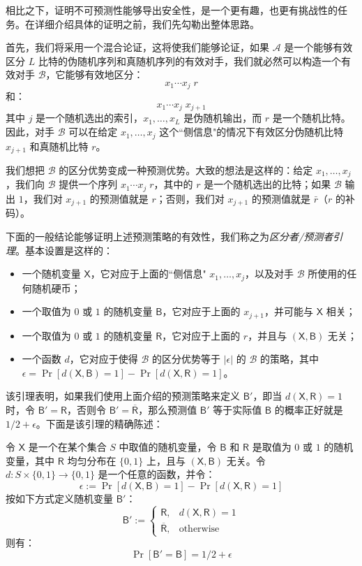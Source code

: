 相比之下，证明不可预测性能够导出安全性，是一个更有趣，也更有挑战性的任务。在详细介绍具体的证明之前，我们先勾勒出整体思路。

首先，我们将采用一个混合论证，这将使我们能够论证，如果 $\mathcal{A}$ 是一个能够有效区分 $L$ 比特的伪随机序列和真随机序列的有效对手，我们就必然可以构造一个有效对手 $\mathcal{B}$，它能够有效地区分：
\[
x_1\cdots x_j\;r
\]
和：
\[
x_1\cdots x_j\;x_{j+1}
\]
其中 $j$ 是一个随机选出的索引，$x_1,\dots,x_L$ 是伪随机输出，而 $r$ 是一个随机比特。因此，对手 $\mathcal{B}$ 可以在给定 $x_1,\dots,x_j$ 这个``侧信息"的情况下有效区分伪随机比特 $x_{j+1}$ 和真随机比特 $r$。

我们想把 $\mathcal{B}$ 的区分优势变成一种预测优势。大致的想法是这样的：给定 $x_1,\dots,x_j$，我们向 $\mathcal{B}$ 提供一个序列 $x_1\cdots x_j\;r$，其中的 $r$ 是一个随机选出的比特；如果 $\mathcal{B}$ 输出 $1$，我们对 $x_{j+1}$ 的预测值就是 $r$；否则，我们对 $x_{j+1}$ 的预测值就是 $\bar{r}$（$r$ 的补码）。

下面的一般结论能够证明上述预测策略的有效性，我们称之为\emph{区分者/预测者引理}。基本设置是这样的：
\begin{itemize}
	\item 一个随机变量 $\mathsf{X}$，它对应于上面的``侧信息" $x_1,\dots,x_j$，以及对手 $\mathcal{B}$ 所使用的任何随机硬币；
	\item 一个取值为 $0$ 或 $1$ 的随机变量 $\mathsf{B}$，它对应于上面的 $x_{j+1}$，并可能与 $\mathsf{X}$ 相关；
	\item 一个取值为 $0$ 或 $1$ 的随机变量 $\mathsf{R}$，它对应于上面的 $r$，并且与 $(\mathsf{X},\mathsf{B})$ 无关；
	\item 一个函数 $d$，它对应于使得 $\mathcal{B}$ 的区分优势等于 $|\epsilon|$ 的 $\mathcal{B}$ 的策略，其中 $\epsilon=\Pr[d(\mathsf{X},\mathsf{B})=1]-\Pr[d(\mathsf{X},\mathsf{R})=1]$。
\end{itemize}
该引理表明，如果我们使用上面介绍的预测策略来定义 $\mathsf{B}'$，即当 $d(\mathsf{X},\mathsf{R})=1$ 时，令 $\mathsf{B}'=\mathsf{R}$，否则令 $\mathsf{B}'=\mathsf{\overline R}$，那么预测值 $\mathsf{B}'$ 等于实际值 $\mathsf{B}$ 的概率正好就是 $1/2+\epsilon$。下面是该引理的精确陈述：

\begin{lemma}\label{lemma:3-5}
令 $\mathsf{X}$ 是一个在某个集合 $S$ 中取值的随机变量，令 $\mathsf{B}$ 和 $\mathsf{R}$ 是取值为 $0$ 或 $1$ 的随机变量，其中 $\mathsf{R}$ 均匀分布在 $\{0,1\}$ 上，且与 $(\mathsf{X},\mathsf{B})$ 无关。令 $d:S\times\{0,1\}\to\{0,1\}$ 是一个任意的函数，并令：
\[
\epsilon
:=
\Pr[d(\mathsf{X},\mathsf{B})=1]
-
\Pr[d(\mathsf{X},\mathsf{R})=1]
\]
按如下方式定义随机变量 $\mathsf{B}'$：
\[
\mathsf{B}':=
\left\{
\begin{array}{ll}
\mathsf{R}, & d(\mathsf{X},\mathsf{R})=1\\
\mathsf{\overline R}, & \text{otherwise}
\end{array}
\right.
\]
则有：
\[
\Pr[\mathsf{B}'=\mathsf{B}]={1}/{2}+\epsilon
\]
\end{lemma}

